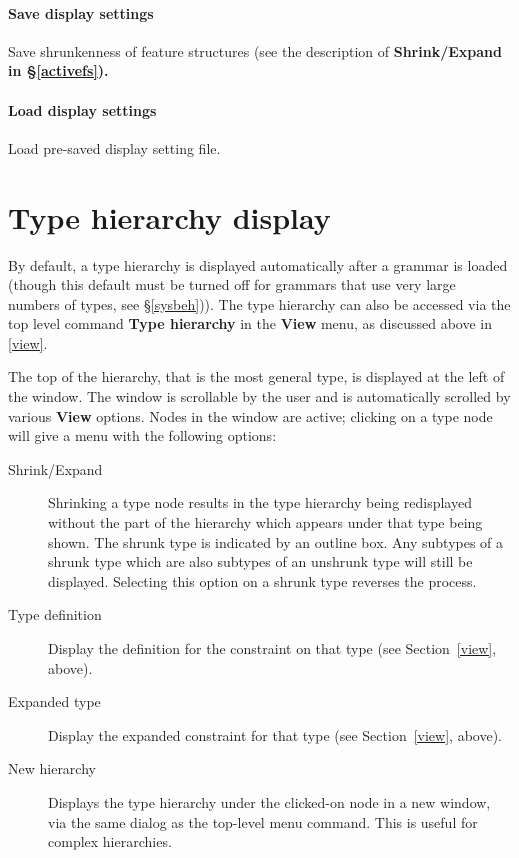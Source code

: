 \documentclass[12pt]{report}
\newcommand{\lkbmenucommand}{\bf}
\begin{document}
\paragraph{Save display settings} Save shrunkenness of feature structures
(see the description
of \lkbmenucommand{Shrink/Expand} in \S\ref{activefs}).

\paragraph{Load display settings} Load pre-saved display setting file.


\section{Type hierarchy display}
\label{thier}

By default, a type hierarchy
is displayed automatically after a grammar is loaded 
(though this default must be turned off for grammars that use very
large numbers of types, see \S\ref{sysbeh})).
The type hierarchy
can also be accessed via the top level command {\lkbmenucommand Type hierarchy}
in the {\lkbmenucommand View} menu, as discussed above in \ref{view}.

The top of the hierarchy, that is the most
general type, is displayed at the left of the window.  The window is
scrollable by the user and is automatically scrolled by various {\lkbmenucommand
View} options.  Nodes in the window are active; clicking on a type
node will give a menu with the following options:
\begin{description}
\item[Shrink/Expand] Shrinking a type node results in the type
hierarchy being redisplayed without the part of the hierarchy which
appears under that type being shown.  The shrunk type is indicated by
an outline box.  Any subtypes of a shrunk type which are also subtypes
of an unshrunk type will still be displayed.  Selecting this option on
a shrunk type reverses the process.
\item[Type definition] 
Display the definition for the constraint on that 
type (see Section~\ref{view},
above).
\item[Expanded type]
Display the expanded constraint for that type (see
Section~\ref{view}, above).
\item[New hierarchy]
Displays the type hierarchy under the clicked-on node in a new
window, via the same dialog as the top-level menu command.
This is useful for complex hierarchies.
\end{description}
\end{document}
